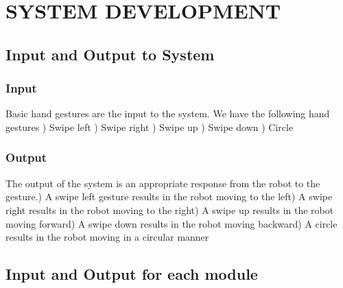 
\chapter{SYSTEM DEVELOPMENT} %

\section{Input and Output to System}
\subsection{Input}
Basic hand gestures are the input to the system. We have the following hand gestures \newline {}) Swipe left  ) Swipe right ) Swipe up ) Swipe down ) Circle 
\subsection{Output}
The output of the system is an appropriate response from the robot to the gesture.) A swipe left gesture results in the robot moving to the left) A swipe right results in the robot moving to the right) A swipe up results in the robot moving forward) A swipe down results in the robot moving backward) A circle results in the robot moving in a circular manner\newline
\section{Input and Output for each module}
